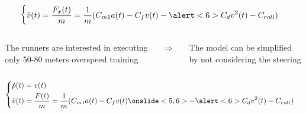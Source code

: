 \documentclass[9pt, aspectratio=169]{beamer}
\begin{document}
\begin{frame}[t]
\begin{columns}
\begin{column}{0.6\textwidth}
\begin{equation*}
\begin{cases}
\begin{aligned}
			\dot{v}(t) &= \frac{F_x(t)}{m} = \frac{1}{m} (C_{m1}a(t) - C_f v(t) - \alert<6>{C_d v^2(t) - C_{roll}}) \\
		\end{aligned}
	\end{cases}
	\end{equation*}
\end{column}
\end{columns}
\vspace{0.1cm}
\begin{columns}
\begin{column}{0.40\textwidth}
 \begin{block}{}
\centering
{} The runners are interested in executing \\
only 50-80 meters overspeed training 
\end{block}
\end{column}
\begin{column}{0.05\textwidth}
\centering
{} $\Rightarrow$
\end{column}
\begin{column}{0.35\textwidth}
\begin{block}{}
\centering
{} The model can be simplified \\
 by not considering the steering
\end{block}
\end{column}
\end{columns}

\vspace{0.6cm}

\begin{columns}
\hspace{0.8cm}
\begin{column}{0.4\textwidth}
\vspace{-0.9cm}
\begin{equation*}
	\begin{cases}
 	\begin{aligned}
		\dot{p}(t) &= v(t) \\
		\dot{v}(t) &= \frac{F(t)}{m} = \frac{1}{m} (C_{m1} a(t) - C_f v(t) \onslide<5,6>{- \alert<6>{C_d v^2(t) - C_{roll}})}
	\end{aligned}
	\end{cases}
\end{equation*}
\end{column}


\end{columns}
\end{frame}
\end{document}
